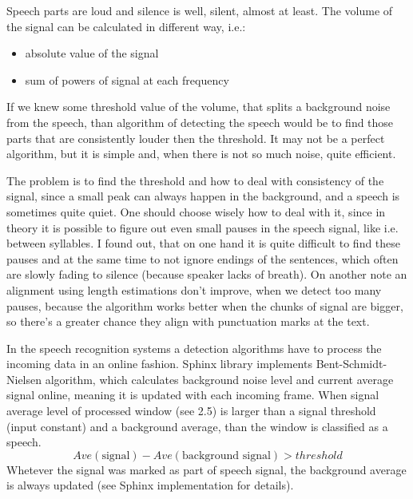 \documentclass[12pt,a4paper,english]{article}
\begin{document}
Speech parts are loud and silence is well, silent, almost at least. The volume of the signal can be calculated in different way, i.e.:
\begin{itemize}
    \item absolute value of the signal
    \item sum of powers of signal at each frequency
\end{itemize}
If we knew some threshold value of the volume, that splits a background noise from the speech, than algorithm of detecting the speech would be to find those parts that are consistently louder then the threshold. It may not be a perfect algorithm, but it is simple and, when there is not so much noise, quite efficient.

\newpage

The problem is to find the threshold and how to deal with consistency of the signal, since a small peak can always happen in the background, and a speech is sometimes quite quiet. \newline
One should choose wisely how to deal with it, since in theory it is possible to figure out even small pauses in the speech signal, like i.e. between syllables.
I found out, that on one hand it is quite difficult to find these pauses and at the same time to not ignore endings of the sentences, which often are slowly fading to silence (because speaker lacks of breath). On another note an alignment using length estimations don't improve, when we detect too many pauses,
because the algorithm works better when the chunks of signal are bigger, so there's a greater chance they align with punctuation marks at the text. \newline

In the speech recognition systems a detection algorithms have to process the incoming data in an online fashion. Sphinx library implements Bent-Schmidt-Nielsen algorithm, which calculates background noise level and current average signal online, meaning it is updated with each incoming frame. \newline
When signal average level of processed window (see 2.5) is larger than a signal threshold (input constant) and a background average, than the window is classified as a speech. \newline
\begin{equation}
    Ave(\text{signal}) - Ave(\text{background signal}) > threshold
\end{equation}
Whetever the signal was marked as part of speech signal, the background average is always updated (see Sphinx implementation for details). \newline
\end{document}
